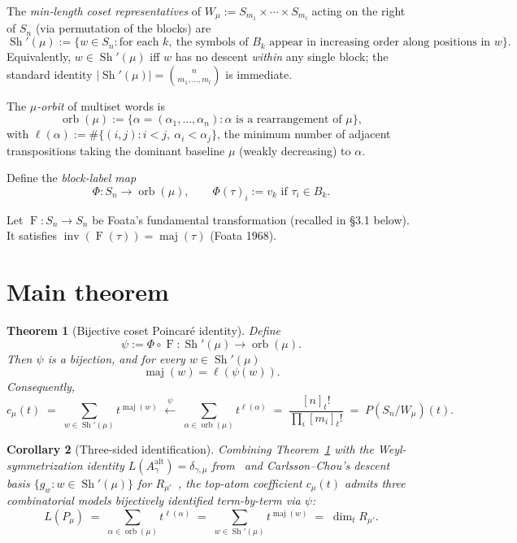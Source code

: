 \documentclass[11pt]{article}
\newtheorem{theorem}{Theorem}
\newtheorem{corollary}[theorem]{Corollary}
\theoremstyle{definition}
\DeclareMathOperator{\Sh}{Sh}
\DeclareMathOperator{\orb}{orb}
\DeclareMathOperator{\inv}{inv}
\DeclareMathOperator{\maj}{maj}
\newcommand{\Foata}{\operatorname{F}}
\newcommand{\Phimap}{\Phi}
\begin{document}
The \emph{min-length coset representatives} of $W_\mu := S_{m_1} \times
\cdots \times S_{m_l}$ acting on the right of $S_n$ (via permutation of the
blocks) are
\[
    \Sh'(\mu) := \bigl\{ w \in S_n : \text{for each } k,\ \text{the symbols of } B_k
    \text{ appear in increasing order along positions in } w \bigr\}.
\]
Equivalently, $w \in \Sh'(\mu)$ iff $w$ has no descent \emph{within} any single
block; the standard identity $\lvert\Sh'(\mu)\rvert = \binom{n}{m_1, \ldots, m_l}$
is immediate.

The \emph{$\mu$-orbit} of multiset words is
\[
    \orb(\mu) := \{ \alpha = (\alpha_1, \ldots, \alpha_n) : \alpha
    \text{ is a rearrangement of } \mu \},
\]
with $\ell(\alpha) := \#\{(i,j) : i < j,\ \alpha_i < \alpha_j\}$, the minimum
number of adjacent transpositions taking the dominant baseline $\mu$ (weakly
decreasing) to $\alpha$.

Define the \emph{block-label map}
\[
    \Phimap : S_n \to \orb(\mu), \qquad
    \Phimap(\tau)_i := v_k \text{ if } \tau_i \in B_k.
\]

Let $\Foata : S_n \to S_n$ be Foata's fundamental transformation
(recalled in \S3.1 below).  It satisfies $\inv(\Foata(\tau)) = \maj(\tau)$
(Foata 1968).

\section{Main theorem}

\begin{theorem}[Bijective coset Poincar\'e identity]
\label{thm:main}
Define
\[
    \psi := \Phimap \circ \Foata : \Sh'(\mu) \to \orb(\mu).
\]
Then $\psi$ is a bijection, and for every $w \in \Sh'(\mu)$
\[
    \maj(w) = \ell(\psi(w)).
\]
Consequently,
\[
    c_\mu(t) \;=\; \sum_{w \in \Sh'(\mu)} t^{\maj(w)} \;\xleftarrow{\;\psi\;}\;
    \sum_{\alpha \in \orb(\mu)} t^{\ell(\alpha)} \;=\; \frac{[n]_t!}{\prod_i [m_i]_t!}
    \;=\; P(S_n/W_\mu)(t).
\]
\end{theorem}

\begin{corollary}[Three-sided identification]
Combining Theorem~\ref{thm:main} with the Weyl-symmetrization identity
$L(A^{\mathrm{alt}}_\gamma) = \delta_{\gamma,\mu}$ from~\cite{ClioPrevious}
and Carlsson--Chou's descent basis $\{g_w : w \in \Sh'(\mu)\}$ for
$R_{\mu'}$~\cite{CarlssonChou}, the top-atom coefficient $c_\mu(t)$ admits three
combinatorial models bijectively identified term-by-term via $\psi$:
\[
    L(P_\mu) \;=\; \sum_{\alpha \in \orb(\mu)} t^{\ell(\alpha)}
             \;=\; \sum_{w \in \Sh'(\mu)} t^{\maj(w)}
             \;=\; \dim_t R_{\mu'}.
\]
\end{corollary}
\end{document}
